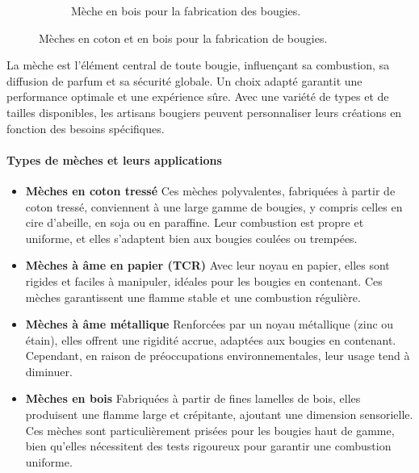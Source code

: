 \documentclass[11pt,fleqn,onecolumn,oneside]{book}
\begin{document}
\begin{figure}[htbp]
\begin{subfigure}[b]{0.45\textwidth}
        \caption{Mèche en bois pour la fabrication des bougies.}
        \label{fig:meche_bois}
    \end{subfigure}
    \caption{Mèches en coton et en bois pour la fabrication de bougies.}
    \label{fig:comparaison_meches}
\end{figure}


\begin{definition}
La mèche est l’élément central de toute bougie, influençant sa combustion, sa diffusion de parfum et sa sécurité globale. Un choix adapté garantit une performance optimale et une expérience sûre. Avec une variété de types et de tailles disponibles, les artisans bougiers peuvent personnaliser leurs créations en fonction des besoins spécifiques.
\end{definition}

\paragraph{Types de mèches et leurs applications}

\begin{itemize}
    \item \textbf{Mèches en coton tressé} Ces mèches polyvalentes, fabriquées à partir de coton tressé, conviennent à une large gamme de bougies, y compris celles en cire d’abeille, en soja ou en paraffine. Leur combustion est propre et uniforme, et elles s’adaptent bien aux bougies coulées ou trempées.
    
    \item \textbf{Mèches à âme en papier (TCR)} Avec leur noyau en papier, elles sont rigides et faciles à manipuler, idéales pour les bougies en contenant. Ces mèches garantissent une flamme stable et une combustion régulière.
    
    \item \textbf{Mèches à âme métallique} Renforcées par un noyau métallique (zinc ou étain), elles offrent une rigidité accrue, adaptées aux bougies en contenant. Cependant, en raison de préoccupations environnementales, leur usage tend à diminuer.
    
    \item \textbf{Mèches en bois} Fabriquées à partir de fines lamelles de bois, elles produisent une flamme large et crépitante, ajoutant une dimension sensorielle. Ces mèches sont particulièrement prisées pour les bougies haut de gamme, bien qu’elles nécessitent des tests rigoureux pour garantir une combustion uniforme.
\end{itemize}
\end{document}
